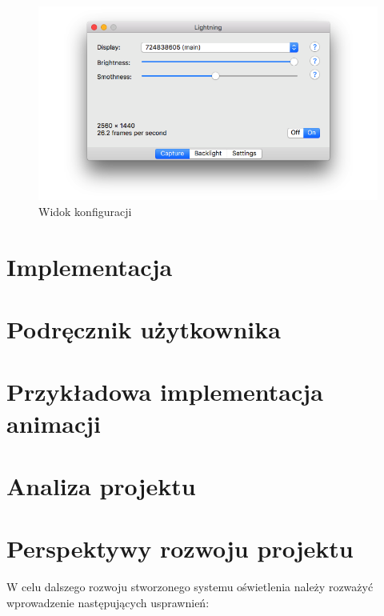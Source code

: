 \documentclass[12pt]{report}
\begin{document}
\begin{figure}[h]
\centering
\includegraphics[width=\textwidth]{../resources/capture.png}
\caption{Widok konfiguracji}
\end{figure}

\section{Implementacja}


\section{Podręcznik użytkownika}


\section{Przykładowa implementacja animacji}


\section{Analiza projektu}


\section{Perspektywy rozwoju projektu}

W celu dalszego rozwoju stworzonego systemu oświetlenia należy rozważyć wprowadzenie następujących usprawnień:
\end{document}
